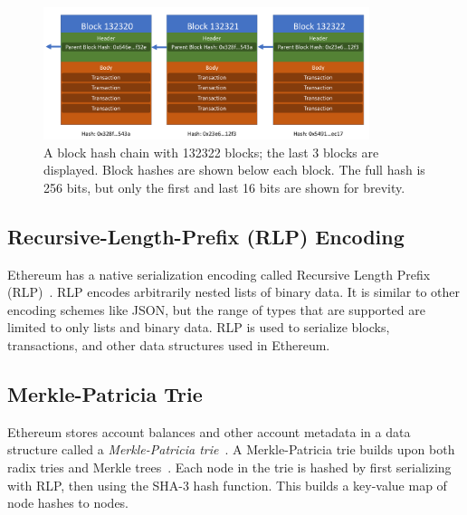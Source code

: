 \documentclass[12pt]{article}
\newcommand{\figurewidth}{0.85\textwidth}
\begin{document}
\begin{figure}[H]
  \centering
  \includegraphics[width=\figurewidth]{../figures/background/blocks/blocks.pdf}
  \caption{A block hash chain with 132322 blocks; the last 3 blocks are displayed. Block hashes are shown below each block. The full hash is 256 bits, but only the first and last 16 bits are shown for brevity.}
\end{figure}


\subsection{Recursive-Length-Prefix (RLP) Encoding} \label{subsection:rlp}

Ethereum has a native serialization encoding called Recursive Length Prefix (RLP)~\cite{rlp}. RLP encodes arbitrarily nested lists of binary data. It is similar to other encoding schemes like JSON, but the range of types that are supported are limited to only lists and binary data. RLP is used to serialize blocks, transactions, and other data structures used in Ethereum.

\subsection{Merkle-Patricia Trie} \label{subsection:merklepatriciatrie}

Ethereum stores account balances and other account metadata in a data structure called a \emph{Merkle-Patricia trie}~\cite{merkle-patricia-trie}. A Merkle-Patricia trie builds upon both radix tries and Merkle trees~\cite{merkle1987digital}. Each node in the trie is hashed by first serializing with RLP, then using the SHA-3 hash function. This builds a key-value map of node hashes to nodes.
\end{document}
